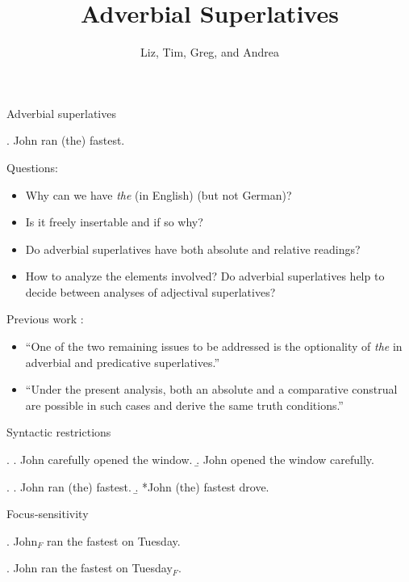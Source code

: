\documentclass[xcolor=dvipsnames]{beamer}
\title{Adverbial Superlatives}
\author[Comparatives Group]{Liz, Tim, Greg, and Andrea}
\institute{SIASSI Summer Institute 2015}
\begin{document}
\frame{\titlepage}



\begin{frame}{Adverbial superlatives}

\ex. John ran (the) fastest.

Questions:
\begin{itemize}
\item Why can we have {\em the} (in English) (but not German)? 
\item Is it freely insertable and if so why?
\item Do adverbial superlatives have both absolute and relative
  readings?
\item How to analyze the elements involved? Do adverbial superlatives
  help to decide between analyses of adjectival superlatives?
\end{itemize}
\end{frame}

\begin{frame}{Previous work}
\citet{krasikova:2012}:

\begin{itemize}
\item ``One of the two remaining issues to be addressed is the
  optionality of {\em the} in adverbial and predicative
  superlatives.''
\item ``Under the present analysis, both an absolute and a
  comparative construal are possible in such cases and derive the same
  truth conditions.''
\end{itemize}

\end{frame}


\begin{frame}{Syntactic restrictions}

\ex.
\a. John carefully opened the window.
\b. John opened the window carefully.

\ex.
\a. John ran (the) fastest.
\b. *John (the) fastest drove.

\end{frame}


\begin{frame}{Focus-sensitivity}


\ex. John$_F$ ran the fastest on Tuesday.

\ex. John ran the fastest on Tuesday$_F$.

\end{frame}
\end{document}

